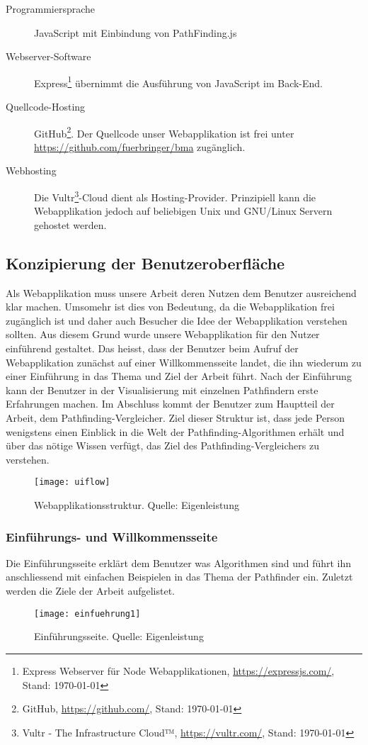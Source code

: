 \begin{description}
  \item [Programmiersprache] JavaScript mit Einbindung von PathFinding.js \cite{pfjs}
  \item [Webserver-Software] Express\footnote{Express Webserver für Node Webapplikationen, \url{https://expressjs.com/}, Stand: \today} übernimmt die Ausführung von JavaScript im Back-End.
  \item [Quellcode-Hosting] GitHub\footnote{GitHub, \url{https://github.com/}, Stand: \today}. Der Quellcode unser Webapplikation ist frei unter\\ \url{https://github.com/fuerbringer/bma} zugänglich.
  \item [Webhosting] Die Vultr\footnote{Vultr - The Infrastructure Cloud™, \url{https://vultr.com/}, Stand: \today}-Cloud dient als Hosting-Provider. Prinzipiell kann die Webapplikation jedoch auf beliebigen Unix und GNU/Linux Servern gehostet werden.
\end{description}

\subsection{Konzipierung der Benutzeroberfläche}
Als Webapplikation muss unsere Arbeit deren Nutzen dem Benutzer ausreichend klar machen. 
Umsomehr ist dies von Bedeutung, da die Webapplikation frei zugänglich ist und daher auch Besucher die Idee der Webapplikation verstehen sollten. 
Aus diesem Grund wurde unsere Webapplikation für den Nutzer einführend gestaltet. 
Das heisst, dass der Benutzer beim Aufruf der Webapplikation zunächst auf einer Willkommensseite landet, die ihn wiederum zu einer Einführung in das Thema und Ziel der Arbeit führt. 
Nach der Einführung kann der Benutzer in der Visualisierung mit einzelnen Pathfindern erste Erfahrungen machen. 
Im Abschluss kommt der Benutzer zum Hauptteil der Arbeit, dem Pathfinding-Vergleicher. 
Ziel dieser Struktur ist, dass jede Person wenigstens einen Einblick in die Welt der Pathfinding-Algorithmen erhält und über das nötige Wissen verfügt, das Ziel des Pathfinding-Vergleichers zu verstehen.
\begin{figure}[H]
  \centering
  \texttt{[image: uiflow]}
  \caption[Struktur der Webapplikation.]{Webapplikationsstruktur. Quelle: Eigenleistung}
  \label{fig:uiflow}
\end{figure}

\clearpage

\subsubsection{Einführungs- und Willkommensseite}
Die Einführungsseite erklärt dem Benutzer was Algorithmen sind und führt ihn anschliessend mit einfachen Beispielen in das Thema der Pathfinder ein. Zuletzt werden die Ziele der Arbeit aufgelistet.
\begin{figure}[H]
  \centering
  \texttt{[image: einfuehrung1]}
  \caption[Konzept der Einführungsseite.]{Einführungsseite. Quelle: Eigenleistung}
  \label{fig:einfuehrung1}
\end{figure}


